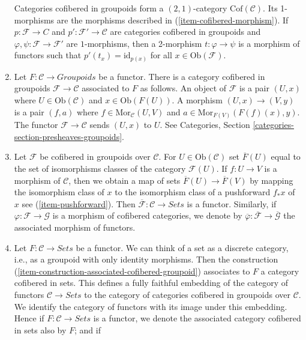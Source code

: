 \begin{remarks}
\begin{enumerate}
Categories cofibered in groupoids form a $(2, 1)$-category 
$\text{Cof}(\mathcal{C})$. Its 1-morphisms are the morphisms described in 
(\ref{item-cofibered-morphism}). If $p: \mathcal{F} \to C$ and 
$p': \mathcal{F}' \to \mathcal{C}$ are categories cofibered in groupoids 
and $\varphi, \psi: \mathcal{F} \to \mathcal{F}'$ are $1$-morphisms, then 
a 2-morphism $t: \varphi \to \psi$ is a morphism of functors such that 
$p'(t_x) = \text{id}_{p(x)}$ for all $x \in \text{Ob}(\mathcal{F})$.
\item
\label{item-construction-associated-cofibered-groupoid} 
Let $F : \mathcal{C} \to \textit{Groupoids}$ be a functor. There 
is a category cofibered in groupoids $\mathcal{F} \to \mathcal{C}$ 
associated to $F$ as follows. An object of $\mathcal{F}$ is a pair $(U, x)$ 
where $U \in \text{Ob}(\mathcal{C})$ and $x \in \text{Ob}(F(U))$. A 
morphism $(U,x) \to (V,y)$ is a pair $(f, a)$ where
$f \in \text{Mor}_{\mathcal{C}}(U,V)$ and
$a \in \text{Mor}_{F(V)}(F(f)(x),y)$.
The functor $\mathcal{F} \to \mathcal{C}$ sends $(U, x)$ to $U$. See
Categories, Section \ref{categories-section-presheaves-groupoids}.
\item Let $\mathcal{F}$ be cofibered in groupoids over $\mathcal{C}$.
For $U \in \text{Ob}(\mathcal{C})$ set $\overline{F}(U)$ equal to
the set of isomorphisms classes of the category $\mathcal{F}(U)$.
If $f : U \to V$ is a morphism of $\mathcal{C}$, then we obtain a
map of sets $\overline{F}(U) \to \overline{F}(V)$ by mapping the
isomorphism class of $x$ to the isomorphism class of a pushforward
$f_*x$ of $x$ see (\ref{item-pushforward}). Then
$\overline{\mathcal{F}} : \mathcal{C} \to \textit{Sets}$ is a
functor. Similarly, if $\varphi: \mathcal{F} \to \mathcal G$ is a
morphism of cofibered categories, we denote by
$\overline{\varphi}: \overline{\mathcal{F}} \to  \overline{\mathcal G}$
the associated morphism of functors.
\item 
\label{item-convention-cofibered-sets}
Let $F: \mathcal{C} \to \textit{Sets}$ be a functor. We can think of a
set as a discrete category, i.e., as a groupoid with only identity morphisms.
Then the construction (\ref{item-construction-associated-cofibered-groupoid})
associates to $F$ a category cofibered in sets. This defines a fully
faithful embedding of the category of functors $\mathcal{C} \to \textit{Sets}$
to the category of categories cofibered in groupoids over $\mathcal{C}$.
We identify the category of functors with its image under this embedding.
Hence if $F : \mathcal{C} \to \textit{Sets}$ is a functor, we denote the 
associated category cofibered in sets also by $F$; and if

\end{enumerate}
\end{remarks}

